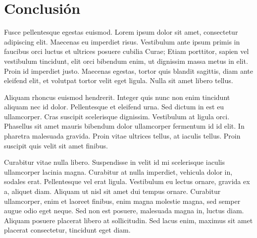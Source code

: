 \documentclass[final,inline,a4paper,narroweqnarray]{ieee}
\begin{document}
\section{Conclusión}

Fusce pellentesque egestas euismod. Lorem ipsum dolor sit amet, consectetur adipiscing elit. Maecenas eu imperdiet risus. Vestibulum ante ipsum primis in faucibus orci luctus et ultrices posuere cubilia Curae; Etiam porttitor, sapien vel vestibulum tincidunt, elit orci bibendum enim, ut dignissim massa metus in elit. Proin id imperdiet justo. Maecenas egestas, tortor quis blandit sagittis, diam ante eleifend elit, et volutpat tortor velit eget ligula. Nulla sit amet libero tellus.

Aliquam rhoncus euismod hendrerit. Integer quis nunc non enim tincidunt aliquam nec id dolor. Pellentesque et eleifend urna. Sed dictum in est eu ullamcorper. Cras suscipit scelerisque dignissim. Vestibulum at ligula orci. Phasellus sit amet mauris bibendum dolor ullamcorper fermentum id id elit. In pharetra malesuada gravida. Proin vitae ultrices tellus, at iaculis tellus. Proin suscipit quis velit sit amet finibus.

Curabitur vitae nulla libero. Suspendisse in velit id mi scelerisque iaculis ullamcorper lacinia magna. Curabitur at nulla imperdiet, vehicula dolor in, sodales erat. Pellentesque vel erat ligula. Vestibulum eu lectus ornare, gravida ex a, aliquet diam. Aliquam ut nisl sit amet dui tempus ornare. Curabitur ullamcorper, enim et laoreet finibus, enim magna molestie magna, sed semper augue odio eget neque. Sed non est posuere, malesuada magna in, luctus diam. Aliquam posuere placerat libero at sollicitudin. Sed lacus enim, maximus sit amet placerat consectetur, tincidunt eget diam.
\end{document}
